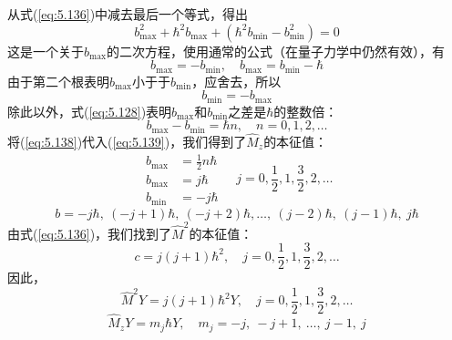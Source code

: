     从式(\ref{eq:5.136})中减去最后一个等式，得出
    \begin{equation*}
        b_{\max}^2 + \hbar^2b_{\max} + \left(\hbar^2b_{\min}- b_{\min}^2\right) = 0
    \end{equation*}
    这是一个关于$b_{\max}$的二次方程，使用通常的公式（在量子力学中仍然有效），有
    \begin{equation*}
        b_{\max} = -b_{\min}, \quad b_{\max} = b_{\min} - \hbar
    \end{equation*}
    由于第二个根表明$b_{\max}$小于于$b_{\min}$，应舍去，所以
    \begin{equation}
        b_{\min} = -b_{\max}
        \label{eq:5.138}
    \end{equation}
    除此以外，式(\ref{eq:5.128})表明$b_{\max}$和$b_{\min}$之差是$\hbar$的整数倍：
    \begin{equation}
        b_{\max} - b_{\min} = \hbar n, \quad n = 0, 1, 2, \ldots
        \label{eq:5.139}
    \end{equation}
    将(\ref{eq:5.138})代入(\ref{eq:5.139})，我们得到了$\hat{M}_z$的本征值：
    \begin{equation}
        \begin{aligned}
            b_{\max} & = \frac{1}{2}n\hbar \\
            b_{\max} & = j\hbar \\
            b_{\min} & = -j\hbar
        \end{aligned} \quad j = 0, \frac{1}{2}, 1, \frac{3}{2}, 2, \ldots
        \label{eq:5.140}
    \end{equation}
    \begin{equation}
        b = -j\hbar, \: \left(-j+1\right)\hbar, \: \left(-j+2\right)\hbar, \ldots, \: \left(j-2\right)\hbar, \: \left(j-1\right)\hbar, \: j\hbar
        \label{eq:5.141}
    \end{equation}
    由式(\ref{eq:5.136})，我们找到了$\hat{M}^2$的本征值：
    \begin{equation}
        c = j\left(j+1\right)\hbar^2, \quad j = 0, \frac{1}{2}, 1, \frac{3}{2}, 2, \ldots
        \label{eq:5.142}
    \end{equation}
    因此，
    \begin{equation}
        \hat{M}^2Y = j\left(j+1\right)\hbar^2Y, \quad j = 0, \frac{1}{2}, 1, \frac{3}{2}, 2, \ldots
        \label{eq:5.143}
    \end{equation}
    \begin{equation}
        \hat{M}_zY = m_j\hbar Y, \quad m_j = -j, \: -j+1, \: \ldots, \:j-1, \: j
        \label{eq:5.144}
    \end{equation}


